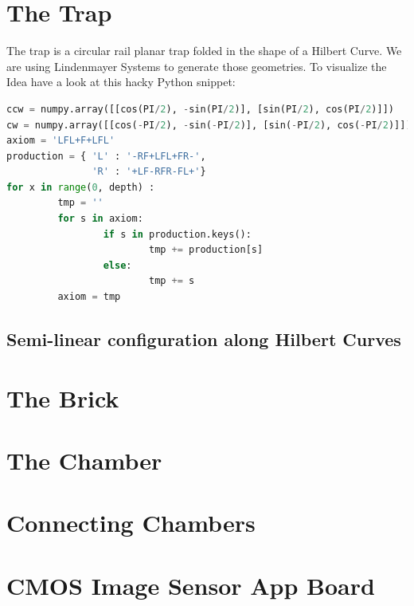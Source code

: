 \documentclass[11pt, a4paper]{scrartcl}
\begin{document}
\section{The Trap}
The trap is a circular rail planar trap folded in the shape of a Hilbert Curve. We are using Lindenmayer Systems to generate those geometries.
To visualize the Idea have a look at this hacky Python snippet:
\\
\begin{lstlisting}[language=Python]
ccw = numpy.array([[cos(PI/2), -sin(PI/2)], [sin(PI/2), cos(PI/2)]])
cw = numpy.array([[cos(-PI/2), -sin(-PI/2)], [sin(-PI/2), cos(-PI/2)]])
axiom = 'LFL+F+LFL'
production = { 'L' : '-RF+LFL+FR-',
               'R' : '+LF-RFR-FL+'}
for x in range(0, depth) :
         tmp = ''
         for s in axiom:
                 if s in production.keys():
                         tmp += production[s]
                 else:
                         tmp += s
         axiom = tmp

\end{lstlisting}
\subsection{Semi-linear configuration along Hilbert Curves}
\section{The Brick}
\section{The Chamber}
\section{Connecting Chambers}
\section{CMOS Image Sensor App Board}
\end{document}
